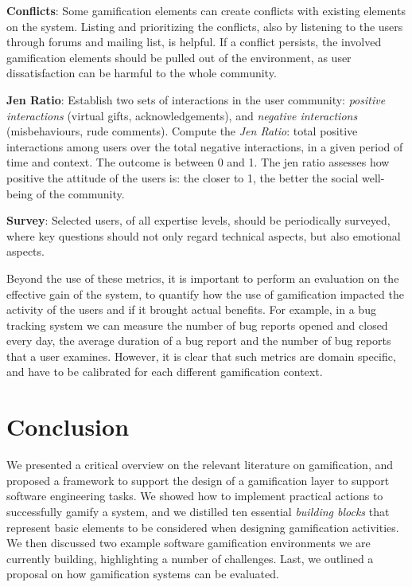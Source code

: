 \textbf{Conflicts}: Some gamification elements can create conflicts with existing elements on the system.
Listing and prioritizing the conflicts, also by listening to the users through forums and mailing list, is helpful.
If a conflict persists, the involved gamification elements should be pulled out of the environment, as user dissatisfaction can be harmful to the whole community.

\textbf{Jen Ratio}: Establish two sets of interactions in the user community: \emph{positive interactions} (\eg virtual gifts, acknowledgements), and \emph{negative interactions} (\eg misbehaviours, rude comments).
Compute the \emph{Jen Ratio}: total positive interactions among users over the total negative interactions, in a given period of time and context.
The outcome is between 0 and 1.
The jen ratio assesses how positive the attitude of the users is: the closer to 1, the better the social well-being of the community.

\textbf{Survey}: Selected users, of all expertise levels, should be periodically surveyed, where key questions should not only regard technical aspects, but also emotional aspects.


Beyond the use of these metrics, it is important to perform an evaluation on the effective gain of the system, to quantify how the use of gamification impacted the activity of the users and if it brought actual benefits.
For example, in a bug tracking system we can measure the number of bug reports opened and closed every day, the average duration of a bug report and the number of bug reports that a user examines.
However, it is clear that such metrics are domain specific, and have to be calibrated for each different gamification context.


\section{Conclusion}\label{sec:conclusion}

We presented a critical overview on the relevant literature on gamification, and proposed a framework to support the design of a gamification layer to support software engineering tasks.
We showed how to implement practical actions to successfully gamify a system, and we distilled ten essential \emph{building blocks} that represent basic elements to be considered when designing gamification activities.
We then discussed two example software gamification environments we are currently building, highlighting a number of challenges.
Last, we outlined a proposal on how gamification systems can be evaluated.

